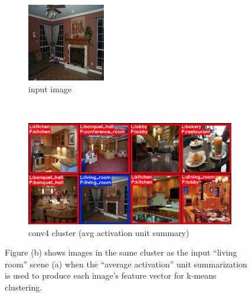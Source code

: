 \begin{figure}[t]
\centering
  \begin{subfigure}[b]{.24\linewidth}
    \centering
    \includegraphics[width=.99\textwidth]{figures/clustering/living_room}
    \caption{input image}\label{fig:clustering_living_room_input}
  \end{subfigure}  \\%
  \begin{subfigure}[b]{.99\linewidth}
    \centering
    \includegraphics[width=.99\textwidth]{figures/clustering/living_room_conv4_avg}
    \caption{conv4 cluster (avg activation unit summary)}\label{fig:clustering_living_room_conv4}
  \end{subfigure}%
  \caption{Figure (b) shows images in the same cluster as the input ``living room'' scene (a) when the ``average activation'' unit summarization is used to produce each image's feature vector for k-means clustering.}
  \label{fig:living_room_cluster}
\end{figure}

